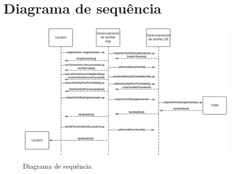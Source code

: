 
\chapter{Diagrama de sequência}

\begin{figure}[h]
    \centering
    \includegraphics[width=1\textwidth]{../figures/diagramaDeSequencia.jpeg}
    \caption{Diagrama de sequência}
    \label{fig:diagramaDeSequencia}
\end{figure}
